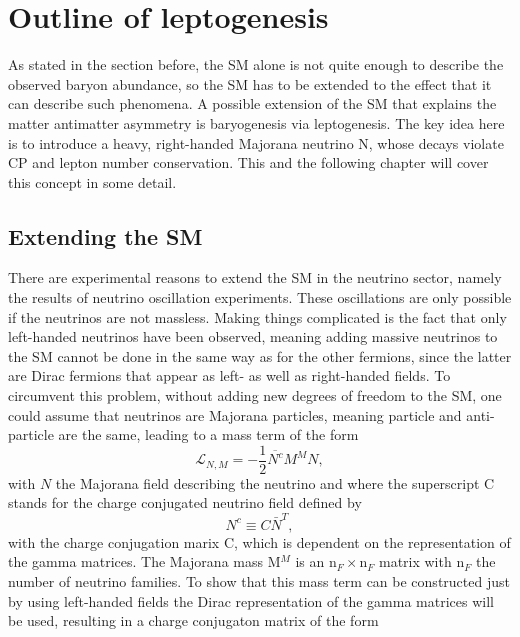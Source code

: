 \chapter{Outline of leptogenesis}
As stated in the section before, the SM alone is not quite enough to describe the observed baryon abundance, so the SM has to be extended to the effect that it can describe such phenomena. \newline\indent
A possible extension of the SM that explains the matter antimatter asymmetry is baryogenesis via leptogenesis. The key idea here is to introduce a heavy, right-handed Majorana neutrino N, whose decays violate CP and lepton number conservation. \newline\indent
This and the following chapter will cover this concept in some detail.
\section{Extending the SM}
There are experimental reasons to extend the SM in the neutrino sector, namely the results of neutrino oscillation experiments. These oscillations are only possible if the neutrinos are not massless. Making things complicated is the fact that only left-handed neutrinos have been observed, meaning adding massive neutrinos to the SM cannot be done in the same way as for the other fermions, since the latter are Dirac fermions that appear as left- as well as right-handed fields. To circumvent this problem, without adding new degrees of freedom to the SM, one could assume that neutrinos are Majorana particles, meaning particle and anti-particle are the same, leading to a mass term of the form \cite{Drewes:2013gca}
\begin{equation}
\mathcal{L}_{N,M}=-\frac{1}{2}\overline{N^c}M^MN,
\label{eq:neutrino_majorana}
\end{equation}
with $N$ the Majorana field describing the neutrino and where the superscript C stands for the charge conjugated neutrino field defined by
\begin{equation*}
	N^c\equiv C\bar{N}^T,
\end{equation*}
with the charge conjugation marix C, which is dependent on the representation of the gamma matrices. The Majorana mass M$^M$ is an n$_F\times$n$_F$ matrix with n$_F$ the number of neutrino families. \newline\indent
To show that this mass term can be constructed just by using left-handed fields the Dirac representation of the gamma matrices will be used, resulting in a charge conjugaton matrix of the form
